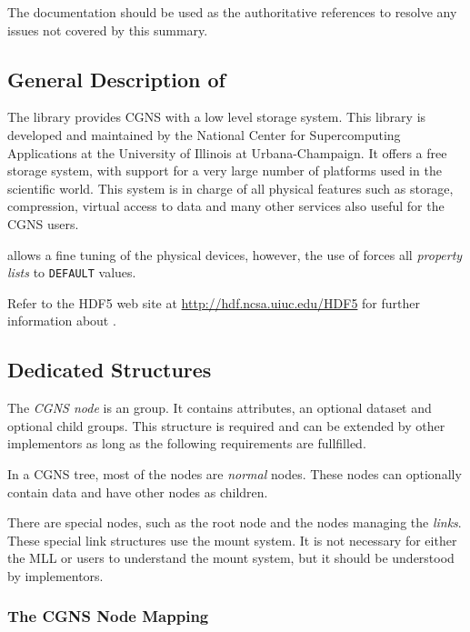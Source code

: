 The \HDF documentation should be used as the authoritative
references to resolve any issues not covered by this summary.

\subsection{General Description of \HDF}

The \HDF library provides CGNS with a low level storage system.  
This library is developed and maintained by the National Center
for Supercomputing Applications at the University of Illinois at
Urbana-Champaign.
It offers a
free storage system, with support for a very large number of platforms
used in the scientific world.  This system is in charge of all
physical features such as storage, compression, virtual access to data
and many other services also useful for the CGNS users.

\HDF allows a fine tuning of the physical devices, however, the \SLL
use of \HDF forces all \emph{property lists} to \texttt{DEFAULT}
values.

Refer to the HDF5 web site at \url{http://hdf.ncsa.uiuc.edu/HDF5} for
further information about \HDF.

\subsection{Dedicated \HDF Structures}
\label{s:adfnodestructure}

The \emph{CGNS node} is an \HDF group. It contains attributes, an optional
dataset and optional child groups. This structure is required and can be
extended by other implementors as long as the following requirements are
fullfilled.

In a CGNS tree, most of the nodes are \emph{normal} nodes. These nodes
can optionally contain data and have other nodes as children. 

There are special nodes, such as the root node and
the nodes managing the \emph{links}. These special link structures use
the \HDF mount system. It is not necessary for either the MLL 
or \SLL users to understand the \HDF mount system, but it should be 
understood by \SLL implementors.

\subsubsection{The CGNS Node Mapping}

